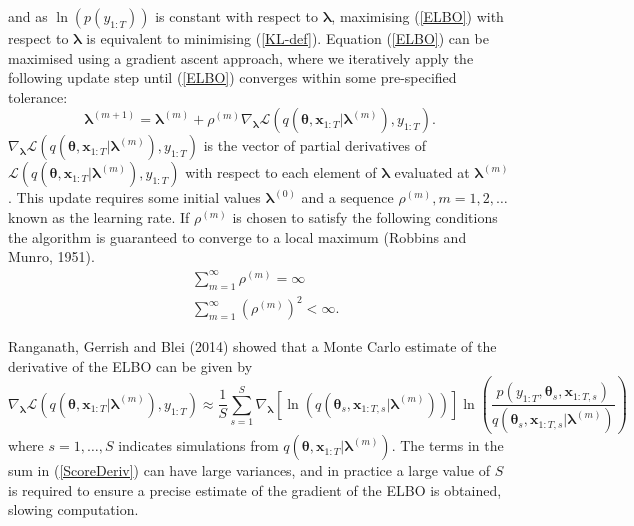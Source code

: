 \documentclass[12pt,a4paper]{article}%
\numberwithin{equation}{section}
\begin{document}
and as $\ln(p(y_{1:T}))$ is constant with respect to $\boldsymbol{\lambda}$, maximising (\ref{ELBO}) with respect to $\boldsymbol{\lambda}$ is equivalent to minimising (\ref{KL-def}). Equation (\ref{ELBO}) can be maximised using a gradient ascent approach, where we iteratively apply the following update step until (\ref{ELBO}) converges within some pre-specified tolerance:
\begin{equation}
\label{GradAscent}
\boldsymbol{\lambda}^{(m+1)} = \boldsymbol{\lambda}^{(m)} + \rho^{(m)} \nabla_{\boldsymbol{\lambda}} \mathcal{L}(q(\boldsymbol{\theta}, \textbf{x}_{1:T} | \boldsymbol{\lambda}^{(m)}), y_{1:T}).
\end{equation}
$\nabla_{\boldsymbol{\lambda}}\mathcal{L}(q(\boldsymbol{\theta}, \textbf{x}_{1:T} | \boldsymbol{\lambda}^{(m)}), y_{1:T})$ is the vector of partial derivatives of $\mathcal{L}(q(\boldsymbol{\theta}, \textbf{x}_{1:T} | \boldsymbol{\lambda}^{(m)}), y_{1:T})$ with respect to each element of $\boldsymbol{\lambda}$ evaluated at $\boldsymbol{\lambda}^{(m)}$. This update requires some initial values $\boldsymbol{\lambda}^{(0)}$ and a sequence $\rho^{(m)}, m = 1, 2, \dots$ known as the learning rate. If $\rho^{(m)}$ is chosen to satisfy the following conditions the algorithm is guaranteed to converge to a local maximum (Robbins and Munro, 1951).
\begin{align}
&\sum_{m=1}^{\infty} \rho^{(m)} =  \infty \\
&\sum_{m=1}^{\infty} (\rho^{(m)})^2 <  \infty.
\end{align}

Ranganath, Gerrish and Blei (2014) showed that a Monte Carlo estimate of the derivative of the ELBO can be given by
\begin{equation}
\label{ScoreDeriv}
\nabla_{\boldsymbol{\lambda}}\mathcal{L}(q(\boldsymbol{\theta}, \textbf{x}_{1:T} | \boldsymbol{\lambda}^{(m)}), y_{1:T}) \approx \frac{1}{S}\sum_{s=1}^{S} \nabla_{\boldsymbol{\lambda}} [\ln(q(\boldsymbol{\theta}_s, \textbf{x}_{1:T, s} | \boldsymbol{\lambda}^{(m)}))] \ln \left(\frac{p(y_{1:T}, \boldsymbol{\theta}_s, \textbf{x}_{1:T, s})}{q(\boldsymbol{\theta}_s, \textbf{x}_{1:T, s} | \boldsymbol{\lambda}^{(m)})} \right) 
\end{equation}
where $s = 1, \dots, S$ indicates simulations from $q(\boldsymbol{\theta}, \textbf{x}_{1:T} | \boldsymbol{\lambda}^{(m)})$. 
The terms in the sum in (\ref{ScoreDeriv}) can have large variances, and in practice a large value of $S$ is required to ensure a precise estimate of the gradient of the ELBO is obtained, slowing computation. 
\end{document}
